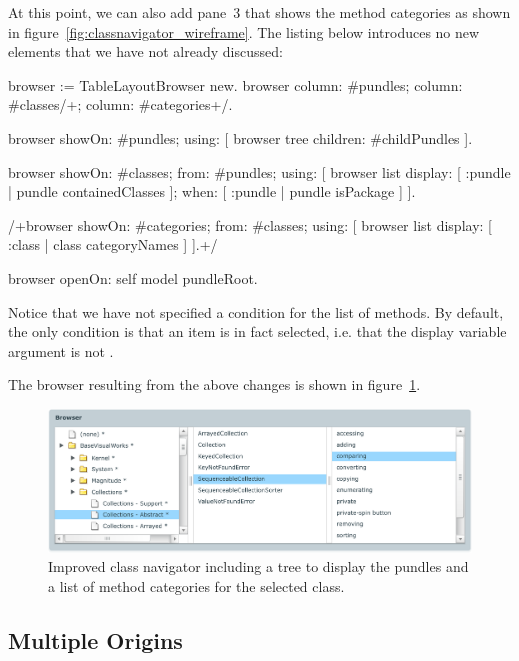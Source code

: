 \documentclass[a4paper,10pt,twoside]{book}
\begin{document}
At this point, we can also add pane~3 that shows the method categories as shown in figure~\ref{fig:classnavigator_wireframe}. The listing below introduces no new elements that we have not already discussed:

\begin{code}{}
browser := TableLayoutBrowser new.
browser
	column: #pundles;
	column: #classes/+;
	column: #categories+/.	

browser showOn: #pundles; using: [
	browser tree
		children: #childPundles
].

browser showOn: #classes; from: #pundles; using: [
	browser list
		display: [ :pundle | pundle containedClasses ];
		when: [ :pundle | pundle isPackage ]
].

/+browser showOn: #categories; from: #classes; using: [
	browser list
		display: [ :class | class categoryNames ]
].+/

browser openOn: self model pundleRoot.
\end{code} 

Notice that we have not specified a  condition for the list of methods. By default, the only condition is that an item is in fact selected, i.e. that the display variable argument is not .

The browser resulting from the above changes is shown in figure~\ref{fig:treeandcategories}.

\begin{figure}[htbp]
\centerline{\includegraphics[width=\linewidth]{treeandcategories.pdf}}
\caption{	Improved class navigator including a tree to display the pundles and a list of method categories for the selected class.}
\label{fig:treeandcategories}
\end{figure}



\subsection{Multiple Origins}
\end{document}
